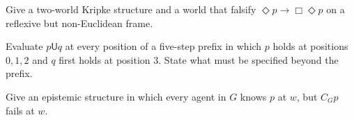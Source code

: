 \begin{exercise}
\label{ex:modal-temporal-epistemic-01}
Give a two-world Kripke structure and a world that falsify
\(\Diamond p\to\Box\Diamond p\) on a reflexive but non-Euclidean frame.
\end{exercise}

\begin{exercise}
\label{ex:modal-temporal-epistemic-02}
Evaluate \(p\mathbin{\mathsf U}q\) at every position of a five-step prefix in
which \(p\) holds at positions \(0,1,2\) and \(q\) first holds at position
\(3\).  State what must be specified beyond the prefix.
\end{exercise}

\begin{exercise}
\label{ex:modal-temporal-epistemic-03}
Give an epistemic structure in which every agent in \(G\) knows \(p\) at \(w\), but
\(C_Gp\) fails at \(w\).
\end{exercise}

